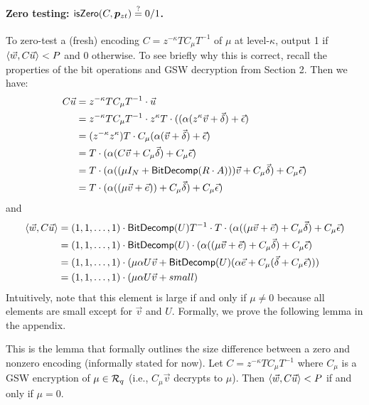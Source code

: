 \paragraph{Zero testing:  $\mathsf{isZero}(C, \bm{p}_{zt}) \stackrel{?}{=} 0/1$.}  To zero-test a (fresh) encoding $C = z^{-\kappa} T C_\mu T^{-1}$ of $\mu$ at level-$\kappa$, output 1 if $\left<\vec{w}, C\vec{u}\right> < P$ and 0 otherwise.  To see briefly why this is correct, recall the properties of the bit operations and GSW decryption from Section 2.  Then we have:
\begin{align*}
C\vec{u} &= z^{-\kappa} T C_\mu T^{-1} \cdot \vec{u}\\
&= z^{-\kappa} T C_\mu  T^{-1} \cdot z^\kappa T\cdot ((\alpha(z^\kappa\vec{v} + \vec{\delta}) + \vec{\epsilon})\\
&= (z^{-\kappa} z^{\kappa}) T \cdot C_\mu (\alpha(\vec{v} + \vec{\delta}) + \vec{\epsilon})\\
&= T \cdot (\alpha(C\vec{v} + C_\mu\vec{\delta}) + C_\mu\vec{\epsilon})\\
&= T \cdot (\alpha((\mu I_{N} + \mathsf{BitDecomp}(R\cdot A)))\vec{v} + C_\mu\vec{\delta}) + C_\mu\vec{\epsilon})\\
&= T \cdot (\alpha((\mu \vec{v} + \vec{e})) + C_\mu\vec{\delta}) + C_\mu\vec{\epsilon})
\end{align*}
and
\begin{align*}
\left<\vec{w}, C\vec{u}\right> &= (1,1,\ldots,1)\cdot\mathsf{BitDecomp}(U)T^{-1}\cdot T \cdot (\alpha((\mu \vec{v} + \vec{e}) + C_\mu\vec{\delta}) + C_\mu\vec{\epsilon})\\
&= (1,1,\ldots,1)\cdot\mathsf{BitDecomp}(U) \cdot (\alpha((\mu \vec{v} + \vec{e}) + C_\mu\vec{\delta}) + C_\mu\vec{\epsilon})\\
&= (1,1,\ldots,1)\cdot(\mu\alpha U \vec{v} + \mathsf{BitDecomp}(U)(\alpha\vec{e} + C_\mu(\vec{\delta} + C_\mu\vec{\epsilon})))\\
&= (1,1,\ldots,1)\cdot(\mu\alpha U \vec{v} + small)
\end{align*} 
Intuitively, note that this element is large if and only if $\mu \not= 0$ because all elements are small except for $\vec{v}$ and $U$.  Formally, we prove the following lemma in the appendix.

\begin{lemma}
\label{zerotesting}
This is the lemma that formally outlines the size difference between a zero and nonzero encoding (informally stated for now).  Let $C = z^{-\kappa} TC_\mu T^{-1}$ where $C_\mu$ is a GSW encryption of $\mu \in \mathcal{R}_q$ (i.e., $C_\mu\vec{v}$ decrypts to $\mu$).  Then $\left<\vec{w}, C\vec{u}\right> < P$ if and only if $\mu = 0$.
\end{lemma}

